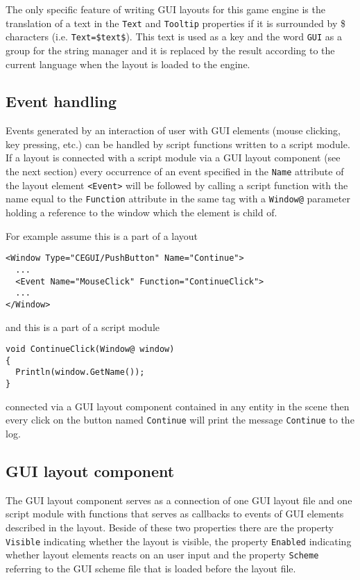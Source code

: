 The only specific feature of writing GUI layouts for this game engine is the translation of a text in the \verb/Text/ and \verb/Tooltip/ properties if it is surrounded by \$ characters (i.e. \verb/Text=$text$/). This text is used as a key and the word \verb/GUI/ as a group for the string manager and it is replaced by the result according to the current language when the layout is loaded to the engine.

\subsection{Event handling}

Events generated by an interaction of user with GUI elements (mouse clicking, key pressing, etc.) can be handled by script functions written to a script module. If a layout is connected with a script module via a GUI layout component (see the next section) every occurrence of an event specified in the \verb/Name/ attribute of the layout element \verb/<Event>/ will be followed by calling a script function with the name equal to the \verb/Function/ attribute in the same tag with a \verb/Window@/ parameter holding a reference to the window which the element is child of.

For example assume this is a part of a layout

\begin{verbatim}
<Window Type="CEGUI/PushButton" Name="Continue">
  ...
  <Event Name="MouseClick" Function="ContinueClick">
  ...
</Window>
\end{verbatim}

\noindent and this is a part of a script module

\begin{verbatim}
void ContinueClick(Window@ window)
{
  Println(window.GetName());
}
\end{verbatim}

\noindent connected via a GUI layout component contained in any entity in the scene then every click on the button named \verb/Continue/ will print the message \verb/Continue/ to the log.

\subsection{GUI layout component}

The GUI layout component serves as a connection of one GUI layout file and one script module with functions that serves as callbacks to events of GUI elements described in the layout. Beside of these two properties there are the property \verb/Visible/ indicating whether the layout is visible, the property \verb/Enabled/ indicating whether layout elements reacts on an user input and the property \verb/Scheme/ referring to the GUI scheme file that is loaded before the layout file.

